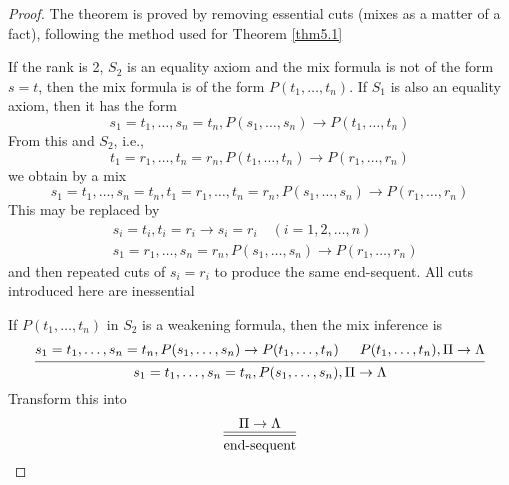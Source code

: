 \documentclass[11pt]{article}
\begin{document}
\begin{proof}
The theorem is proved by removing essential cuts (mixes as a matter of a fact), following the
method used for Theorem \ref{thm5.1}

If the rank is 2, \(S_2\) is an equality axiom and the mix formula is not of the form \(s=t\),
then the mix formula is of the form \(P(t_1,\dots,t_n)\). If \(S_1\) is also an equality axiom,
then it has the form
\begin{equation*}
s_1=t_1,\dots,s_n=t_n,P(s_1,\dots,s_n)\to P(t_1,\dots,t_n)
\end{equation*}
From this and \(S_2\), i.e.,
\begin{equation*}
t_1=r_1,\dots,t_n=r_n,P(t_1,\dots,t_n)\to P(r_1,\dots,r_n)
\end{equation*}
we obtain by a mix
\begin{equation*}
s_1=t_1,\dots,s_n=t_n,t_1=r_1,\dots,t_n=r_n,P(s_1,\dots,s_n)\to P(r_1,\dots,r_n)
\end{equation*}
This may be replaced by
\begin{align*}
&s_i=t_i,t_i=r_i\to s_i=r_i\quad(i=1,2,\dots,n)\\
&s_1=r_1,\dots,s_n=r_n,P(s_1,\dots,s_n)\to P(r_1,\dots,r_n)
\end{align*}
and then repeated cuts of \(s_i=r_i\) to produce the same end-sequent. All cuts introduced here
are inessential

If \(P(t_1,\dots,t_n)\) in \(S_2\) is a weakening formula, then the mix inference is
\begin{equation*}
\begin{prooftree}%
\hypo{s_1=t_1,\dots,s_n=t_n,P(s_1,\dots,s_n)\to P(t_1,\dots,t_n)}
\hypo{P(t_1,\dots,t_n),\Pi\to\Lambda}
\infer2{s_1=t_1,\dots,s_n=t_n,P(s_1,\dots,s_n),\Pi\to\Lambda}
\end{prooftree}
\end{equation*}
Transform this into
\begin{equation*}
\begin{prooftree}%
\hypo{\Pi\to\Lambda}
\infer[double]1{\text{end-sequent}}
\end{prooftree}
\end{equation*}
\end{proof}
\end{document}
